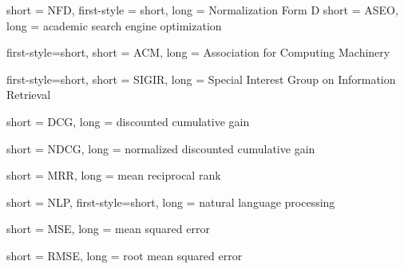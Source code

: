 {
	short = NFD,
	first-style = short,
	long = Normalization Form D
}
{
	short = ASEO,
	long = academic search engine optimization
}

{
	first-style=short,
	short = ACM,
	long = Association for Computing Machinery
}

{
	first-style=short,
	short = SIGIR,
	long = Special Interest Group on Information Retrieval
}

{
	short = DCG,
	long = discounted cumulative gain
}

{
	short = NDCG,
	long = normalized discounted cumulative gain
}

{
	short = MRR,
	long = mean reciprocal rank
}

{
	short = NLP,
	first-style=short,
	long = natural language processing
}

{
	short = MSE,
	long = mean squared error
}

{
	short = RMSE,
	long = root mean squared error
}